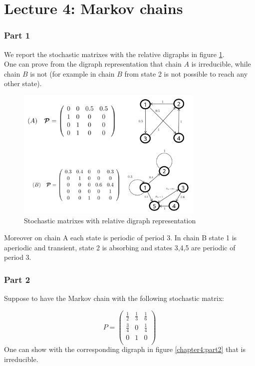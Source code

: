 \chapter*{Lecture 4: Markov chains}

\subsection*{Part 1} We report the stochastic matrixes with the relative digraphs in figure \ref{chapter4:part1}. \\
One can prove from the digraph representation that chain $A$ is irreducible, while chain $B$ is not (for example in chain $B$ from state 2 
is not possible to reach any other state).

\begin{figure}[H]
    \centering
    \includegraphics[width=0.8\textwidth]{FIG/exercise_4_images/Exercise 4_part1.png}
    \caption{Stochastic matrixes with relative digraph representation}
    \label{chapter4:part1}
\end{figure}

Moreover on chain A each state is periodic of period 3. In chain B state 1 is aperiodic and transient, state 2 is absorbing and states 3,4,5 are periodic of period 3.

\subsection*{Part 2}

Suppose to have the Markov chain with the following stochastic matrix:

$$ P =
\begin{pmatrix} 
\frac{1}{2} & \frac{1}{3} & \frac{1}{6} \\
\frac{3}{4} & 0 & \frac{1}{4} \\
0 & 1 & 0 \\
\end{pmatrix}
$$
One can show with the corresponding digraph in figure \ref{chapter4:part2} that is irreducible. \\

